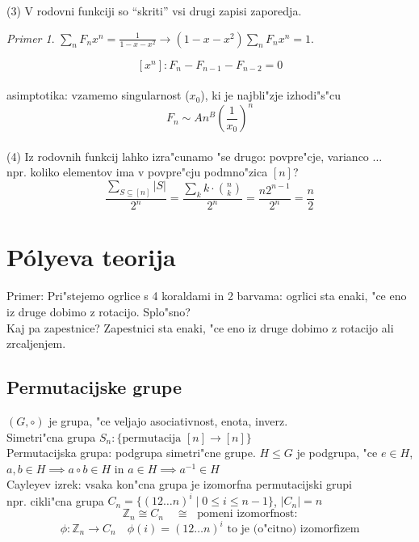 \documentclass[a4paper,12pt]{article}
\theoremstyle{definition}
\theoremstyle{remark}
\newtheorem*{ex}{Primer}
\newcommand{\Z}{\mathbb{Z}}
\begin{document}
(3) V rodovni funkciji so ``skriti'' vsi drugi zapisi zaporedja.
\begin{ex}
	$\sum_n F_n x^n = \frac{1}{1-x-x^2} \to (1-x-x^2) \sum_n F_n x^n = 1$.
\end{ex}
\[[x^n]: F_n - F_{n-1} - F_{n-2} = 0 \] \\
asimptotika: vzamemo singularnost ($x_0$), ki je najbli"zje izhodi"s"cu \[F_n \sim An^B(\frac{1}{x_0})^n\] \\
(4) Iz rodovnih funkcij lahko izra"cunamo "se drugo: povpre"cje, varianco $\dots$ \\
npr. koliko elementov ima v povpre"cju podmno"zica $[n]$?
\[\frac{\sum_{S \subseteq [n]} |S|}{2^n} = \frac{\sum_k k \cdot \binom{n}{k}}{2^n} = \frac{n2^{n-1}}{2^n} = \frac{n}{2}\]

\label{TODO: tukej bom dou svoje zapiske se}
\section{Pólyeva teorija}

Primer: Pri"stejemo ogrlice s 4 koraldami in 2 barvama: ogrlici sta enaki, "ce eno iz druge dobimo z rotacijo.
Splo"sno? \\

Kaj pa zapestnice? Zapestnici sta enaki, "ce eno iz druge dobimo z rotacijo ali zrcaljenjem. \\


\subsection{Permutacijske grupe}

$(G, \circ)$ je grupa, "ce veljajo asociativnost, enota, inverz. \\
Simetri"cna grupa $S_n: \{\text{permutacija } [n] \to [n]\}$ \\
Permutacijska grupa: podgrupa simetri"cne grupe.
$H \leq G$ je podgrupa, "ce $e \in H$, $a,b \in H \implies a \circ b \in H$ in $a \in H \implies a^{-1} \in H$ \\
Cayleyev izrek: vsaka kon"cna grupa je izomorfna permutacijski grupi \\
npr. cikli"cna grupa $C_n = \{(1 2 \dots n)^i \; \vert \; 0 \leq i \leq n-1\}$, $|C_n| = n$ \\
\[\Z_n \cong C_n \quad \cong \; \text{ pomeni izomorfnost:}\]
\[\phi: \Z_n \to C_n \quad \phi(i) = (1 2 \dots n)^i \text{ to je (o"citno) izomorfizem}\]
\end{document}
